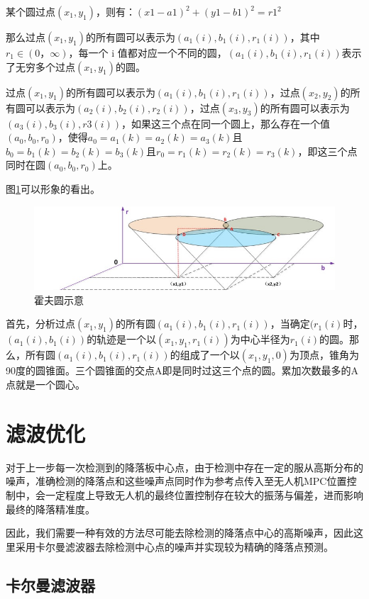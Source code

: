 某个圆过点$(x_{1}, y_{1})$，则有：$(x1-a1)^2 + (y1-b1)^2 = r1^2$

那么过点$(x_{1}, y_{1})$的所有圆可以表示为$(a_{1}(i), b_{1}(i), r_{1}(i))$，其中$r_{1} \in (0，\infty)$，每⼀个 i 值都对应⼀个不同的圆，$(a_{1}(i), b_{1}(i), r_{1}(i))$表示了无穷多个过点$(x_{1}, y_{1})$的圆。

过点$(x_{1}, y_{1})$的所有圆可以表示为$(a_{1}(i), b_{1}(i),r_{1}(i))$，过点$(x_{2}, y_{2})$的所有圆可以表示为$(a_{2}(i),b_{2}(i),r_{2}(i))$，过点$(x_{3}, y_{3})$的所有圆可以表示为$(a_{3}(i),b_{3}(i),r3(i))$，如果这三个点在同一个圆上，那么存在一个值$(a_{0},b_{0},r_{0})$，使得$a_{0} = a_{1}(k) = a_{2}(k) = a_{3}(k)$且$b_{0} = b_{1}(k) = b_{2}(k) = b_{3}(k)$且$r_{0} = r_{1}(k) = r_{2}(k) = r_{3}(k)$，即这三个点同时在圆$(a_{0}, b_{0}, r_{0})$上。

图\ref{Fig:img2}可以形象的看出。

\begin{figure}[ht]
  \centering
  \includegraphics[width=0.8\linewidth]{./Figure/Hough_Circle.png}
  \caption{霍夫圆示意}\label{Fig:img2}
\end{figure}

⾸先，分析过点$(x_{1}, y_{1})$的所有圆$(a_{1}(i), b_{1}(i),r_{1}(i))$，当确定$(r_{1}(i)$时，$(a_{1}(i), b_{1}(i))$的轨迹是⼀个以$(x_{1}, y_{1}, r_{1}(i))$为中心半径为$r_{1}(i)$的圆。那么，所有圆$(a_{1}(i), b_{1}(i),r_{1}(i))$的组成了一个以$(x_{1}, y_{1}, 0)$为顶点，锥角为90度的圆锥面。三个圆锥面的交点A即是同时过这三个点的圆。累加次数最多的A点就是一个圆心。

\section{滤波优化}

对于上一步每一次检测到的降落板中心点，由于检测中存在一定的服从高斯分布的噪声，准确检测的降落点和这些噪声点同时作为参考点传入至无人机MPC位置控制中，会一定程度上导致无人机的最终位置控制存在较大的振荡与偏差，进而影响最终的降落精准度。

因此，我们需要一种有效的方法尽可能去除检测的降落点中心的高斯噪声，因此这里采用卡尔曼滤波器去除检测中心点的噪声并实现较为精确的降落点预测。

\subsection{卡尔曼滤波器}

